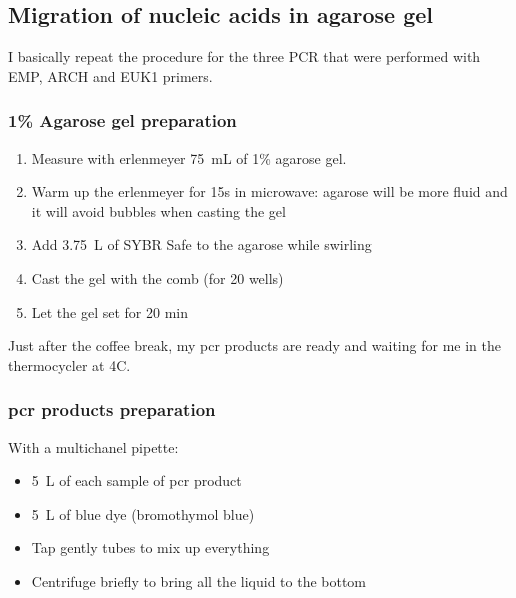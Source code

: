 \subsection{Migration of nucleic acids in agarose gel}
\label{task:20180210_cj1}

I basically repeat the procedure for the three PCR that were performed with EMP, ARCH and EUK1 primers.

\subsubsection{1\% Agarose gel preparation}

\begin{enumerate}
\item Measure with erlenmeyer 75~mL of 1\% agarose gel.
\item Warm up the erlenmeyer for 15s in microwave: agarose will be more fluid and it will avoid bubbles when casting the gel
\item Add 3.75~\textmu L of SYBR Safe to the agarose while swirling 
\item Cast the gel with the comb (for 20 wells)
\item Let the gel set for 20 min
\end{enumerate}

Just after the coffee break, my \gls{pcr} products are ready and waiting for me in the thermocycler at 4\degree C. 

\subsubsection{\gls{pcr} products preparation}

With a multichanel pipette:
\begin{itemize}
\item 5~\textmu L of each sample of \gls{pcr} product
\item 5~\textmu L of blue dye (bromothymol blue)
\item Tap gently tubes to mix up everything
\item Centrifuge briefly to bring all the liquid to the bottom
\end{itemize}

